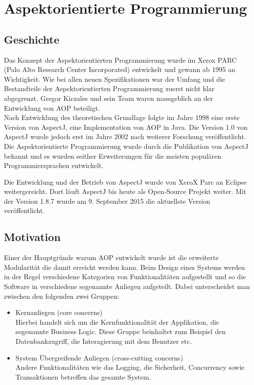 \chapter{Aspektorientierte Programmierung}
\label{chap:aop}

\section{Geschichte}
\label{sec:aop_geschichte}

Das Konzept der Aspektorientierten Programmierung wurde im Xerox PARC (Palo Alto Research Center Incorporated) entwickelt und gewann ab 1995 an Wichtigkeit. Wie bei allen neuen Spezifikationen war der Umfang und die Bestandteile der Aspektorientierten Programmierung zuerst nicht klar abgegrenzt. Gregor Kiczales und sein Team waren massgeblich an der Entwicklung von AOP beteiligt.\\
Nach Entwicklung des theoretischen Grundlage folgte im Jahre 1998 eine erste Version von AspectJ, eine Implementation von AOP in Java. Die Version 1.0 von AspectJ wurde jedoch erst im Jahre 2002 nach weiterer Forschung veröffentlicht.\cite{lopes:historyaop} \\
Die Aspektorientierte Programmierung wurde durch die Publikation von AspectJ bekannt und es wurden seither Erweiterungen für die meisten populären Programmiersprachen entwickelt. 

Die Entwicklung und der Betrieb von AspectJ wurde von XeroX Parc an Eclipse weitergereicht. Dort läuft AspectJ bis heute als Open-Source Projekt weiter. Mit der Version 1.8.7 wurde am 9. September 2015 die aktuellste Version veröffentlicht.

\section{Motivation}
\label{sec:aop_motivation}

Einer der Hauptgründe warum AOP entwickelt wurde ist die erweiterte Modularität die damit erreicht werden kann. Beim Design eines Systems werden in der Regel verschiedene Kategorien von Funktionalitäten aufgestellt und so die Software in verschiedene sogenannte Anliegen aufgeteilt. Dabei unterscheidet man zwischen den folgenden zwei Gruppen:

\begin{itemize}
	\item Kernanliegen (core concerns)\\
	Hierbei handelt sich um die Kernfunktionalität der Applikation, die sogenannte Business Logic. Diese Gruppe beinhaltet zum Beispiel den Datenbankzugriff, die Interagierung mit dem Benutzer etc.
	\item System Übergreifende Anliegen (cross-cutting concerns) \\
	Andere Funktionalitäten wie das Logging, die Sicherheit, Concurrency sowie Transaktionen betreffen das gesamte System.
\end{itemize}

